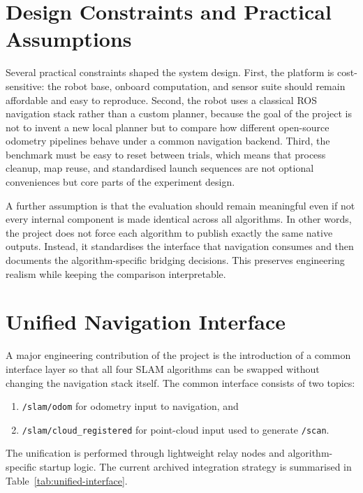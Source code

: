 \documentclass[12pt,a4paper]{report}
\begin{document}
\section{Design Constraints and Practical Assumptions}
Several practical constraints shaped the system design. First, the platform is cost-sensitive: the robot base, onboard computation, and sensor suite should remain affordable and easy to reproduce. Second, the robot uses a classical ROS navigation stack rather than a custom planner, because the goal of the project is not to invent a new local planner but to compare how different open-source odometry pipelines behave under a common navigation backend. Third, the benchmark must be easy to reset between trials, which means that process cleanup, map reuse, and standardised launch sequences are not optional conveniences but core parts of the experiment design.

A further assumption is that the evaluation should remain meaningful even if not every internal component is made identical across all algorithms. In other words, the project does not force each algorithm to publish exactly the same native outputs. Instead, it standardises the interface that navigation consumes and then documents the algorithm-specific bridging decisions. This preserves engineering realism while keeping the comparison interpretable.

\section{Unified Navigation Interface}
A major engineering contribution of the project is the introduction of a common interface layer so that all four SLAM algorithms can be swapped without changing the navigation stack itself. The common interface consists of two topics:
\begin{enumerate}[leftmargin=2em]
    \item \texttt{/slam/odom} for odometry input to navigation, and
    \item \texttt{/slam/cloud\_registered} for point-cloud input used to generate \texttt{/scan}.
\end{enumerate}

The unification is performed through lightweight relay nodes and algorithm-specific startup logic. The current archived integration strategy is summarised in Table~\ref{tab:unified-interface}.
\end{document}
